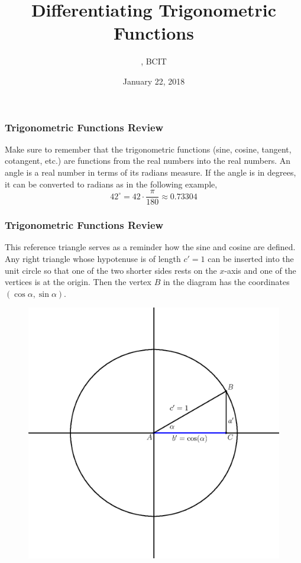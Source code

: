 \documentclass[xcolor=dvipsnames]{beamer}
\title{Differentiating Trigonometric Functions}
\subtitle{{\CourseNumber}, BCIT}
\author{\CourseName}
\date{January 22, 2018}
\begin{document}
\begin{frame}
  \titlepage
\end{frame}

\begin{frame}
  \frametitle{Trigonometric Functions Review}
Make sure to remember that the trigonometric functions (sine, cosine,
tangent, cotangent, etc.) are functions from the real numbers into the
real numbers. An angle is a real number in terms of its
\alert{radians} measure. If the angle is in degrees, it can be
converted to radians as in the following example,
\begin{equation}
  \label{eq:eedeehuc}
  42^{\circ}=42\cdot\frac{\pi}{180}\approx{}0.73304
\end{equation}
\end{frame}

\begin{frame}
  \frametitle{Trigonometric Functions Review}
  This reference triangle serves as a reminder how the sine and cosine
  are defined. Any right triangle whose hypotenuse is of length $c'=1$
  can be inserted into the unit circle so that one of the two shorter
  sides rests on the $x$-axis and one of the vertices is at the
  origin. Then the vertex $B$ in the diagram has the coordinates
  $(\cos\alpha,\sin\alpha)$.
    \begin{figure}[h]
    \includegraphics[scale=.5]{./diagrams/cosine.eps}
  \end{figure}
\end{frame}
\end{document}
